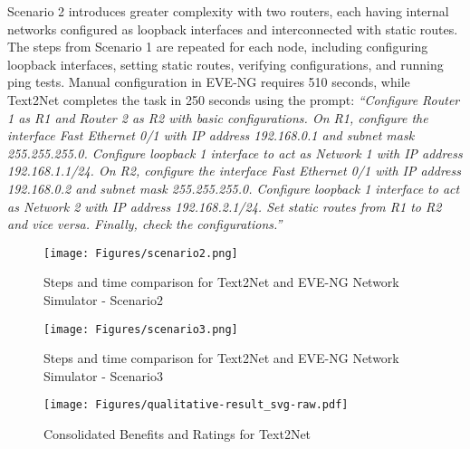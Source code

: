Scenario 2 introduces greater complexity with two routers, each having internal networks configured as loopback interfaces and interconnected with static routes. The steps from Scenario 1 are repeated for each node, including configuring loopback interfaces, setting static routes, verifying configurations, and running ping tests. Manual configuration in EVE-NG requires 510 seconds, while Text2Net completes the task in 250 seconds using the prompt:
\textit{“Configure Router 1 as R1 and Router 2 as R2 with basic configurations. On R1, configure the interface Fast Ethernet 0/1 with IP address 192.168.0.1 and subnet mask 255.255.255.0. Configure loopback 1 interface to act as Network 1 with IP address 192.168.1.1/24. On R2, configure the interface Fast Ethernet 0/1 with IP address 192.168.0.2 and subnet mask 255.255.255.0. Configure loopback 1 interface to act as Network 2 with IP address 192.168.2.1/24. Set static routes from R1 to R2 and vice versa. Finally, check the configurations.”}





\begin{figure}[t]
    \centering
    \texttt{[image: Figures/scenario2.png]}
    \caption{Steps and time comparison for Text2Net and EVE-NG Network Simulator - Scenario2}
    \vspace{-4mm}
    \label{fig: scenario2}
\end{figure}


\begin{figure}[t]
    \centering
    \texttt{[image: Figures/scenario3.png]}
    \caption{Steps and time comparison for Text2Net and EVE-NG Network Simulator - Scenario3}
    \vspace{-4mm}
    \label{fig: scenario3}
\end{figure}


\begin{figure*}[t]
    \centering
    \texttt{[image: Figures/qualitative-result\_svg-raw.pdf]}
    \caption{Consolidated Benefits and Ratings for Text2Net}
    \vspace{-5mm}
    \label{fig: consolidated_results}
\end{figure*}


